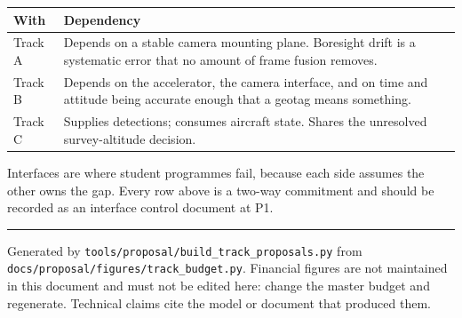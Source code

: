 \documentclass[11pt,a4paper]{article}
\begin{document}
\begin{center}
\begin{tabular}{@{}lp{110mm}@{}}
\toprule
\textbf{With} & \textbf{Dependency} \\
\midrule
Track A & Depends on a stable camera mounting plane. Boresight drift is a systematic error that no amount of frame fusion removes. \\
Track B & Depends on the accelerator, the camera interface, and on time and attitude being accurate enough that a geotag means something. \\
Track C & Supplies detections; consumes aircraft state. Shares the unresolved survey-altitude decision. \\
\bottomrule
\end{tabular}
\end{center}

Interfaces are where student programmes fail, because each side assumes the
other owns the gap. Every row above is a two-way commitment and should be
recorded as an interface control document at P1.


\vfill
\hrule\vspace{2mm}
{\small Generated by \texttt{tools/proposal/build\_track\_proposals.py} from
\texttt{docs/proposal/figures/track\_budget.py}. Financial figures are not
maintained in this document and must not be edited here: change the master
budget and regenerate. Technical claims cite the model or document that
produced them.}
\end{document}
